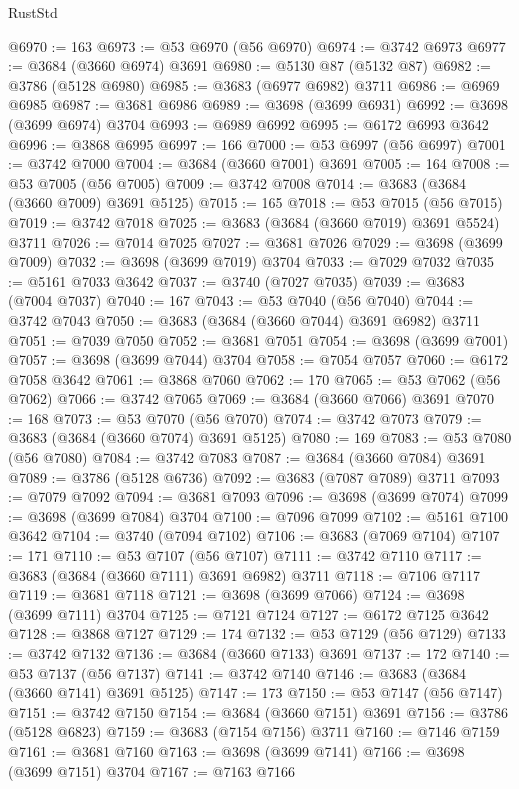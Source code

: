 \begin{lexlean}{RustStd}
\begin{coremodule}
@6970 := 163
@6973 := @53 @6970 (@56 @6970)
@6974 := @3742 @6973
@6977 := @3684 (@3660 @6974) @3691
@6980 := @5130 @87 (@5132 @87)
@6982 := @3786 (@5128 @6980)
@6985 := @3683 (@6977 @6982) @3711
@6986 := @6969 @6985
@6987 := @3681 @6986
@6989 := @3698 (@3699 @6931)
@6992 := @3698 (@3699 @6974) @3704
@6993 := @6989 @6992
@6995 := @6172 @6993 @3642
@6996 := @3868 @6995
@6997 := 166
@7000 := @53 @6997 (@56 @6997)
@7001 := @3742 @7000
@7004 := @3684 (@3660 @7001) @3691
@7005 := 164
@7008 := @53 @7005 (@56 @7005)
@7009 := @3742 @7008
@7014 := @3683 (@3684 (@3660 @7009) @3691 @5125)
@7015 := 165
@7018 := @53 @7015 (@56 @7015)
@7019 := @3742 @7018
@7025 := @3683 (@3684 (@3660 @7019) @3691 @5524) @3711
@7026 := @7014 @7025
@7027 := @3681 @7026
@7029 := @3698 (@3699 @7009)
@7032 := @3698 (@3699 @7019) @3704
@7033 := @7029 @7032
@7035 := @5161 @7033 @3642
@7037 := @3740 (@7027 @7035)
@7039 := @3683 (@7004 @7037)
@7040 := 167
@7043 := @53 @7040 (@56 @7040)
@7044 := @3742 @7043
@7050 := @3683 (@3684 (@3660 @7044) @3691 @6982) @3711
@7051 := @7039 @7050
@7052 := @3681 @7051
@7054 := @3698 (@3699 @7001)
@7057 := @3698 (@3699 @7044) @3704
@7058 := @7054 @7057
@7060 := @6172 @7058 @3642
@7061 := @3868 @7060
@7062 := 170
@7065 := @53 @7062 (@56 @7062)
@7066 := @3742 @7065
@7069 := @3684 (@3660 @7066) @3691
@7070 := 168
@7073 := @53 @7070 (@56 @7070)
@7074 := @3742 @7073
@7079 := @3683 (@3684 (@3660 @7074) @3691 @5125)
@7080 := 169
@7083 := @53 @7080 (@56 @7080)
@7084 := @3742 @7083
@7087 := @3684 (@3660 @7084) @3691
@7089 := @3786 (@5128 @6736)
@7092 := @3683 (@7087 @7089) @3711
@7093 := @7079 @7092
@7094 := @3681 @7093
@7096 := @3698 (@3699 @7074)
@7099 := @3698 (@3699 @7084) @3704
@7100 := @7096 @7099
@7102 := @5161 @7100 @3642
@7104 := @3740 (@7094 @7102)
@7106 := @3683 (@7069 @7104)
@7107 := 171
@7110 := @53 @7107 (@56 @7107)
@7111 := @3742 @7110
@7117 := @3683 (@3684 (@3660 @7111) @3691 @6982) @3711
@7118 := @7106 @7117
@7119 := @3681 @7118
@7121 := @3698 (@3699 @7066)
@7124 := @3698 (@3699 @7111) @3704
@7125 := @7121 @7124
@7127 := @6172 @7125 @3642
@7128 := @3868 @7127
@7129 := 174
@7132 := @53 @7129 (@56 @7129)
@7133 := @3742 @7132
@7136 := @3684 (@3660 @7133) @3691
@7137 := 172
@7140 := @53 @7137 (@56 @7137)
@7141 := @3742 @7140
@7146 := @3683 (@3684 (@3660 @7141) @3691 @5125)
@7147 := 173
@7150 := @53 @7147 (@56 @7147)
@7151 := @3742 @7150
@7154 := @3684 (@3660 @7151) @3691
@7156 := @3786 (@5128 @6823)
@7159 := @3683 (@7154 @7156) @3711
@7160 := @7146 @7159
@7161 := @3681 @7160
@7163 := @3698 (@3699 @7141)
@7166 := @3698 (@3699 @7151) @3704
@7167 := @7163 @7166

\end{coremodule}
\end{lexlean}
